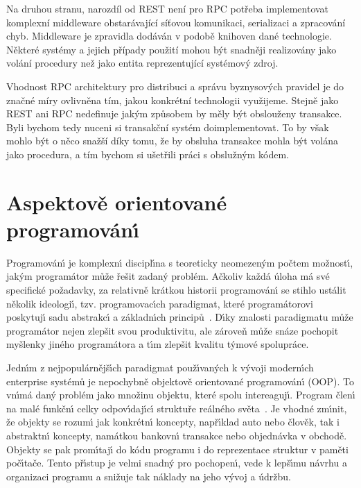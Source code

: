 Na druhou stranu, narozdíl od \gls{REST} není pro \gls{RPC} potřeba
implementovat komplexní middleware obstarávající síťovou komunikaci,
serializaci a zpracování chyb. Middleware je zpravidla dodáván v podobě knihoven
dané technologie. Některé systémy a jejich případy použití mohou být snadněji
realizovány jako volání procedury než jako entita reprezentující systémový zdroj.

Vhodnost \gls{RPC} architektury pro distribuci a správu byznysových pravidel je do značné
míry ovlivněna tím, jakou konkrétní technologii využijeme. Stejně jako \gls{REST}
ani \gls{RPC} nedefinuje jakým způsobem by měly být obslouženy transakce. Byli bychom tedy
nuceni si transakční systém doimplementovat. To by však mohlo být o něco snažší díky tomu,
že by obsluha transakce mohla být volána jako procedura, a tím bychom si ušetřili práci
s obslužným kódem.

\section{Aspektově orientované programován\'{\i}}\label{sec:aop}

Programován\'{\i} je komplexn\'{\i} discipl\'{\i}na s teoreticky
neomezen\'ym počtem možnost\'{\i}, jak\'ym programátor může
řešit zadan\'y problém. Ačkoliv každá úloha má své specifické
požadavky, za relativně krátkou historii programován\'{\i} se
stihlo ustálit několik ideologi\'{\i}, tzv. programovac\'{\i}ch
paradigmat, které programátorovi poskytuj\'{\i} sadu abstrakc\'{\i}
a základn\'{\i}ch principů~\cite{van2009programming}.
D\'{\i}ky znalosti paradigmatu může programátor nejen zlepšit
svou produktivitu, ale zároveň může snáze pochopit myšlenky
jiného programátora a t\'{\i}m zlepšit kvalitu t\'ymové spolupráce.

Jedn\'{\i}m z nejpopulárnějš\'{\i}ch paradigmat použ\'{\i}van\'ych k
v\'yvoji modern\'{\i}ch enterprise systémů je nepochybně
objektově orientované programován\'{\i} (\gls{OOP}). To vn\'{\i}má dan\'y problém
jako množinu objektu, které spolu intereaguj\'{\i}. Program
člen\'{\i} na malé funkčn\'{\i} celky odpov\'{\i}daj\'{\i}c\'{\i} struktuře
reálného světa~\cite{rentsch1982object}. Je vhodné zm\'{\i}nit,
že objekty se rozum\'{\i} jak konkrétn\'{\i} koncepty, např\'{\i}klad
auto nebo člověk, tak i abstraktn\'{\i} koncepty,
namátkou bankovn\'{\i} transakce nebo objednávka v obchodě.
Objekty se pak prom\'{\i}taj\'{\i} do kódu programu i do
reprezentace struktur v paměti poč\'{\i}tače.
Tento př\'{\i}stup je velmi snadn\'y pro pochopen\'{\i},
vede k lepš\'{\i}mu návrhu a organizaci programu a snižuje
tak náklady na jeho v\'yvoj a údržbu.

